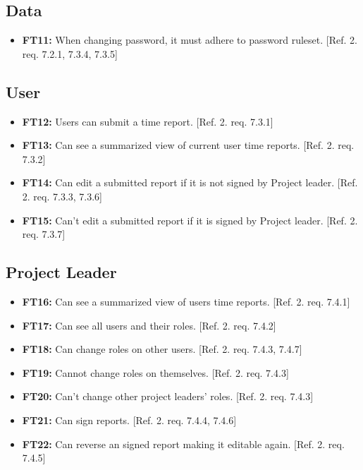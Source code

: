 \documentclass{article}
\begin{document}
		\subsection{Data}
		
		\begin{itemize}
		
  			\item \textbf{FT11:}  When changing password, it must adhere to password ruleset. [Ref. 2. req. 7.2.1, 7.3.4, 7.3.5]

		\end{itemize}
		
		\subsection{User}
		
		\begin{itemize}
  			\item \textbf{FT12:} Users can submit a time report. [Ref. 2. req. 7.3.1]
  			
  			\item \textbf{FT13:} Can see a summarized view of current user time reports. [Ref. 2. req. 7.3.2]
  			
  			\item \textbf{FT14:} Can edit a submitted report if it is not signed by Project leader. [Ref. 2. req. 7.3.3, 7.3.6]
  			
  			 \item \textbf{FT15:} Can't edit a submitted report if it is signed by Project leader. [Ref. 2. req. 7.3.7]


		\end{itemize}
		
		\subsection{Project Leader}
		
			\begin{itemize}
			
			\item \textbf{FT16:} Can see a summarized view of users time reports. [Ref. 2. req. 7.4.1]
			
  			\item \textbf{FT17:} Can see all users and their roles. [Ref. 2. req. 7.4.2]

  			\item \textbf{FT18:} Can change roles on other users. [Ref. 2. req. 7.4.3, 7.4.7]
  			
  			\item \textbf{FT19:} Cannot change roles on themselves. [Ref. 2. req. 7.4.3]
  			
  			\item \textbf{FT20:} Can’t change other project leaders' roles. [Ref. 2. req. 7.4.3]
  			
  			\item \textbf{FT21:} Can sign reports. [Ref. 2. req. 7.4.4, 7.4.6]
  			
  			\item \textbf{FT22:} Can reverse an signed report making it editable again. [Ref. 2. req. 7.4.5]

		\end{itemize}
		
\end{document}
